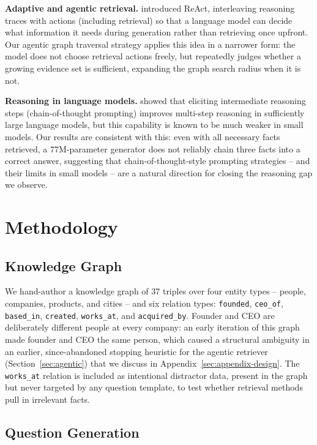 \documentclass[11pt]{article}
\begin{document}
\textbf{Adaptive and agentic retrieval.} \citet{yao2023react} introduced ReAct, interleaving reasoning traces with actions (including retrieval) so that a language model can decide what information it needs during generation rather than retrieving once upfront. Our agentic graph traversal strategy applies this idea in a narrower form: the model does not choose retrieval actions freely, but repeatedly judges whether a growing evidence set is sufficient, expanding the graph search radius when it is not.

\textbf{Reasoning in language models.} \citet{wei2022cot} showed that eliciting intermediate reasoning steps (chain-of-thought prompting) improves multi-step reasoning in sufficiently large language models, but this capability is known to be much weaker in small models. Our results are consistent with this: even with all necessary facts retrieved, a 77M-parameter generator does not reliably chain three facts into a correct answer, suggesting that chain-of-thought-style prompting strategies -- and their limits in small models -- are a natural direction for closing the reasoning gap we observe.

\section{Methodology}
\label{sec:method}

\subsection{Knowledge Graph}

We hand-author a knowledge graph of 37 triples over four entity types -- people, companies, products, and cities -- and six relation types: \texttt{founded}, \texttt{ceo\_of}, \texttt{based\_in}, \texttt{created}, \texttt{works\_at}, and \texttt{acquired\_by}. Founder and CEO are deliberately different people at every company: an early iteration of this graph made founder and CEO the same person, which caused a structural ambiguity in an earlier, since-abandoned stopping heuristic for the agentic retriever (Section~\ref{sec:agentic}) that we discuss in Appendix~\ref{sec:appendix-design}. The \texttt{works\_at} relation is included as intentional distractor data, present in the graph but never targeted by any question template, to test whether retrieval methods pull in irrelevant facts.

\subsection{Question Generation}
\end{document}
